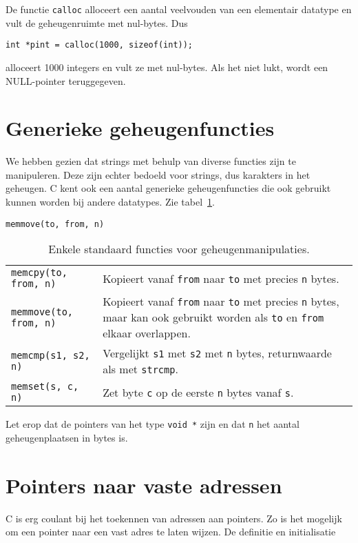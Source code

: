 De functie \texttt{calloc} alloceert een aantal veelvouden van een elementair datatype en vult de geheugenruimte met nul-bytes. Dus

\hspace*{1em}\texttt{int *pint = calloc(1000, sizeof(int));}

alloceert 1000 integers en vult ze met nul-bytes. Als het niet lukt, wordt een NULL-pointer teruggegeven.


\section{Generieke geheugenfuncties}
We hebben gezien dat strings met behulp van diverse functies zijn te manipuleren. Deze zijn echter bedoeld voor strings, dus karakters in het geheugen. C kent ook een aantal generieke geheugenfuncties die ook gebruikt kunnen worden bij andere datatypes. Zie tabel~\ref{tab:arymemmanip}.

\hbox{\texttt{memmove(to, from, n)}}
\begin{table}[!ht]
\centering
\caption{Enkele standaard functies voor geheugenmanipulaties.}
\label{tab:arymemmanip}
\begin{tabular}{@{}p{}p{10cm}@{}}
\toprule
\texttt{memcpy(to, from, n)} &  Kopieert vanaf \texttt{from} naar \texttt{to} met precies \texttt{n} bytes.\\
\texttt{memmove(to, from, n)} &  Kopieert vanaf \texttt{from} naar \texttt{to} met precies \texttt{n} bytes, maar kan ook gebruikt worden als \texttt{to} en \texttt{from} elkaar overlappen.\\
\texttt{memcmp(s1, s2, n)} &  Vergelijkt \texttt{s1} met \texttt{s2} met \texttt{n} bytes, returnwaarde als met \texttt{strcmp}.\\
\texttt{memset(s, c, n)} & Zet byte \texttt{c} op de eerste \texttt{n} bytes vanaf \texttt{s}.\\
\bottomrule
\end{tabular} 
\end{table}

Let erop dat de pointers van het type \texttt{void *} zijn en dat \texttt{n} het aantal geheugenplaatsen in bytes is.


\advanced
\section{Pointers naar vaste adressen}
C is erg coulant bij het toekennen van adressen aan pointers. Zo is het mogelijk om een pointer naar een vast adres te laten wijzen.
De definitie en initialisatie

